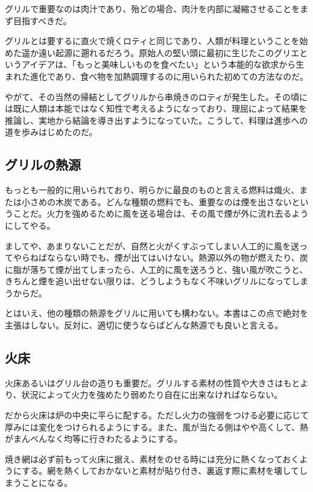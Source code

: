 グリルで重要なのは肉汁であり、殆どの場合、肉汁を内部に凝縮させることをまず目指すべきだ。

グリルとは要するに直火で焼くロティと同じであり、人類が料理ということを始めた遥か遠い起源に遡れるだろう。原始人の堅い頭に最初に生じたこのグリエというアイデアは、「もっと美味しいものを食べたい」という本能的な欲求から生まれた進化であり、食べ物を加熱調理するのに用いられた初めての方法なのだ。

やがて、その当然の帰結としてグリルから串焼きのロティが発生した。その頃には既に人類は本能ではなく知性で考えるようになっており、理屈によって結果を推論し、実地から結論を導き出すようになっていた。こうして、料理は進歩への道を歩みはじめたのだ。

\hypertarget{ux30b0ux30eaux30ebux306eux71b1ux6e90}{%
\subsection{グリルの熱源}\label{ux30b0ux30eaux30ebux306eux71b1ux6e90}}

もっとも一般的に用いられており、明らかに最良のものと言える燃料は熾火、または小さめの木炭である。どんな種類の燃料でも、重要なのは煙を出さないということだ。火力を強めるために風を送る場合は、その風で煙が外に流れ去るようにしてやる。

ましてや、あまりないことだが、自然と火がくすぶってしまい人工的に風を送ってやらねばならない時でも、煙が出てはいけない。熱源以外の物が燃えたり、炭に脂が落ちて煙が出てしまったら、人工的に風を送ろうと、強い風が吹こうと、きちんと煙を追い出せない限りは、どうしようもなく不味いグリルになってしまうからだ。

とはいえ、他の種類の熱源をグリルに用いても構わない。本書はこの点で絶対を主張はしない。反対に、適切に使うならばどんな熱源でも良いと言える。

\hypertarget{ux706bux5e8a}{%
\subsection{火床}\label{ux706bux5e8a}}

火床あるいはグリル台の造りも重要だ。グリルする素材の性質や大きさはもとより、状況によって火力を強めたり弱めたり自在に出来なければならない。

だから火床は炉の中央に平らに配する。ただし火力の強弱をつける必要に応じて厚みには変化をつけられるようにする。また、風が当たる側はやや高くして、熱がまんべんなく均等に行きわたるようにする。

焼き網は必ず前もって火床に据え、素材をのせる時には充分に熱くなっておくようにする。網を熱くしておかないと素材が貼り付き、裏返す際に素材を壊してしまうことになる。

